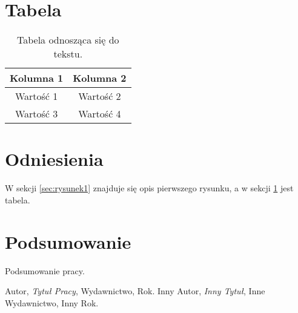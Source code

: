 \documentclass{article}
\begin{document}
\section{Tabela}
\begin{table}[h]
    \centering
    \begin{tabular}{|c|c|}
        \hline
        Kolumna 1 & Kolumna 2 \\
        \hline
        Wartość 1 & Wartość 2 \\
        Wartość 3 & Wartość 4 \\
        \hline
    \end{tabular}
    \caption{Tabela odnosząca się do tekstu.}
    \label{sec:tabela}
\end{table}

\section{Odniesienia}
W sekcji \ref{sec:rysunek1} znajduje się opis pierwszego rysunku, a w sekcji \ref{sec:tabela} jest tabela.

\section{Podsumowanie}
Podsumowanie pracy.

\begin{thebibliography}{99}
     Autor, \emph{Tytuł Pracy}, Wydawnictwo, Rok.
     Inny Autor, \emph{Inny Tytuł}, Inne Wydawnictwo, Inny Rok.
\end{thebibliography}
\end{document}
